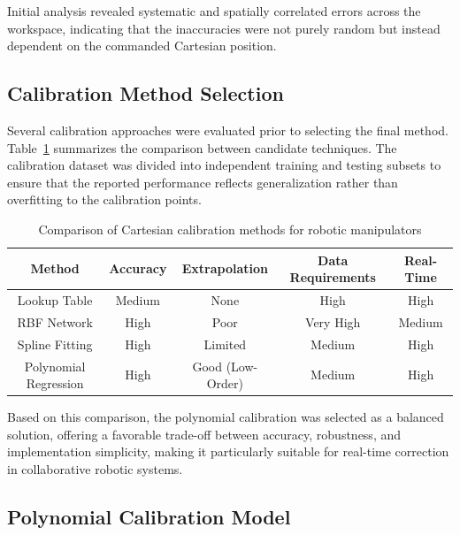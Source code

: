 Initial analysis revealed systematic and spatially correlated errors across the workspace, indicating that the inaccuracies were not purely random but instead dependent on the commanded Cartesian position.

\subsection{Calibration Method Selection}

Several calibration approaches were evaluated prior to selecting the final method. Table~\ref{tab:calib_comparison} summarizes the comparison between candidate techniques. The calibration dataset was divided into independent training and testing subsets to ensure that the reported performance reflects generalization rather than overfitting to the calibration points.

\begin{table}[H]
\centering
\renewcommand{\arraystretch}{1.3}
\begin{tabular}{|c|c|c|c|c|}
\hline
\textbf{Method} &
\textbf{Accuracy} &
\textbf{Extrapolation} &
\textbf{Data Requirements} &
\textbf{Real-Time} \\ \hline

Lookup
Table &
Medium &
None &
High &
High \\ \hline

RBF
Network &
High &
Poor &
Very High &
Medium \\ \hline

Spline
Fitting &
High &
Limited &
Medium &
High \\ \hline

Polynomial
Regression &
High &
Good (Low-Order) &
Medium &
High \\ \hline

\end{tabular}
\caption{Comparison of Cartesian calibration methods for robotic manipulators}
\label{tab:calib_comparison}
\end{table}

Based on this comparison, the polynomial calibration was selected as a balanced solution, offering a favorable trade-off between accuracy, robustness, and implementation simplicity, making it particularly suitable for real-time correction in collaborative robotic systems.

\subsection{Polynomial Calibration Model}

